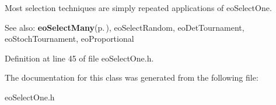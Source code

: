 Most selection techniques are simply repeated applications of eo\-Select\-One.

\begin{Desc}
\item[See also:]{\bf eo\-Select\-Many}{\rm (p.\,\pageref{classeo_select_many})}, eo\-Select\-Random, eo\-Det\-Tournament, eo\-Stoch\-Tournament, eo\-Proportional \end{Desc}




Definition at line 45 of file eo\-Select\-One.h.

The documentation for this class was generated from the following file:\begin{CompactItemize}
\item 
eo\-Select\-One.h\end{CompactItemize}
